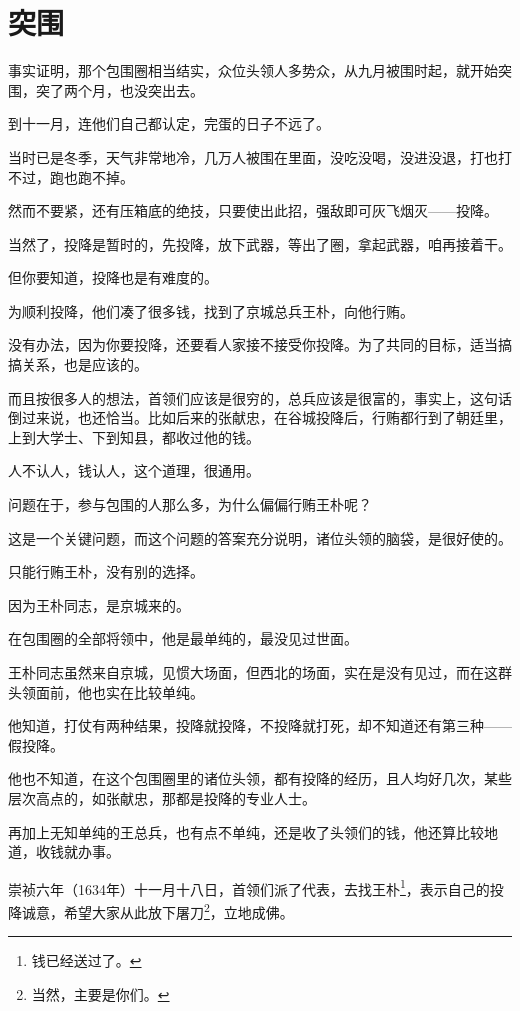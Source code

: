 \section{突围}
\ifnum{}
	\begin{multicols}{\theparacolNo}
		\fi
		事实证明，那个包围圈相当结实，众位头领人多势众，从九月被围时起，就开始突围，突了两个月，也没突出去。

		到十一月，连他们自己都认定，完蛋的日子不远了。

		当时已是冬季，天气非常地冷，几万人被围在里面，没吃没喝，没进没退，打也打不过，跑也跑不掉。

		然而不要紧，还有压箱底的绝技，只要使出此招，强敌即可灰飞烟灭——投降。

		当然了，投降是暂时的，先投降，放下武器，等出了圈，拿起武器，咱再接着干。

		但你要知道，投降也是有难度的。

		为顺利投降，他们凑了很多钱，找到了京城总兵王朴，向他行贿。

		没有办法，因为你要投降，还要看人家接不接受你投降。为了共同的目标，适当搞搞关系，也是应该的。

		而且按很多人的想法，首领们应该是很穷的，总兵应该是很富的，事实上，这句话倒过来说，也还恰当。比如后来的张献忠，在谷城投降后，行贿都行到了朝廷里，上到大学士、下到知县，都收过他的钱。

		人不认人，钱认人，这个道理，很通用。

		问题在于，参与包围的人那么多，为什么偏偏行贿王朴呢？

		这是一个关键问题，而这个问题的答案充分说明，诸位头领的脑袋，是很好使的。

		只能行贿王朴，没有别的选择。

		因为王朴同志，是京城来的。

		在包围圈的全部将领中，他是最单纯的，最没见过世面。

		王朴同志虽然来自京城，见惯大场面，但西北的场面，实在是没有见过，而在这群头领面前，他也实在比较单纯。

		他知道，打仗有两种结果，投降就投降，不投降就打死，却不知道还有第三种——假投降。

		他也不知道，在这个包围圈里的诸位头领，都有投降的经历，且人均好几次，某些层次高点的，如张献忠，那都是投降的专业人士。

		再加上无知单纯的王总兵，也有点不单纯，还是收了头领们的钱，他还算比较地道，收钱就办事。

		崇祯六年（1634年）十一月十八日，首领们派了代表，去找王朴\footnote{钱已经送过了。}，表示自己的投降诚意，希望大家从此放下屠刀\footnote{当然，主要是你们。}，立地成佛。


\end{multicols}
